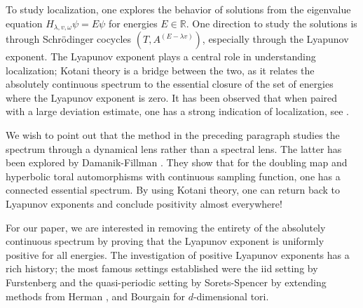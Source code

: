 \documentclass{amsart}
\newcommand{\RR}{\mathbb{R}}
\begin{document}
To study localization, one explores the behavior of solutions from the eigenvalue equation $H_{\lambda, v, \omega} \psi = E\psi$ for energies $E\in \RR$. One direction to study the solutions is through Schr\"odinger cocycles $(T, A^{(E-\lambda v)})$, especially through the Lyapunov exponent. The Lyapunov exponent plays a central role in understanding localization; Kotani theory is a bridge between the two, as it relates the absolutely continuous spectrum to the essential closure of the set of energies where the Lyapunov exponent is zero. It has been observed that when paired with a large deviation estimate, one has a strong indication of localization, see \cite{jz, bg, BouSch, bdf+}.

We wish to point out that the method in the preceding paragraph studies the spectrum through a dynamical lens rather than a spectral lens. The latter has been explored by Damanik-Fillman \cite{DJ3, DJ4}. They show that for the doubling map and hyperbolic toral automorphisms with continuous sampling function, one has a connected essential spectrum. By using Kotani theory, one can return back to Lyapunov exponents and conclude positivity almost everywhere!

For our paper, we are interested in removing the entirety of the absolutely continuous spectrum by proving that the Lyapunov exponent is uniformly positive for all energies. The investigation of positive Lyapunov exponents has a rich history; the most famous settings established were the iid setting by Furstenberg \cite{fursten} and the quasi-periodic setting by Sorets-Spencer \cite{es} by extending methods from Herman \cite{herman}, and Bourgain \cite{Bou} for $d$-dimensional tori.  
\end{document}
